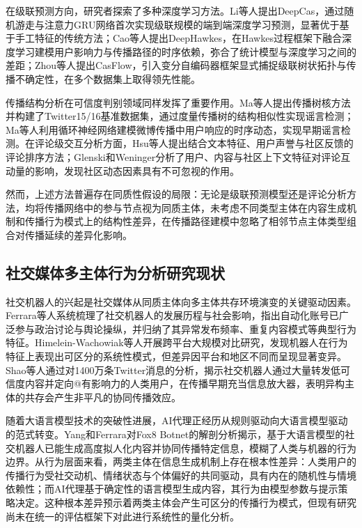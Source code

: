 在级联预测方向，研究者探索了多种深度学习方法。Li等人\cite{li2017deepcas}提出DeepCas，通过随机游走与注意力GRU网络首次实现级联规模的端到端深度学习预测，显著优于基于手工特征的传统方法；Cao等人\cite{cao2017deephawkes}提出DeepHawkes，在Hawkes过程框架下融合深度学习建模用户影响力与传播路径的时序依赖，弥合了统计模型与深度学习之间的差距；Zhou等人\cite{zhou2021casflow}提出CasFlow，引入变分自编码器框架显式捕捉级联树状拓扑与传播不确定性，在多个数据集上取得领先性能。

传播结构分析在可信度判别领域同样发挥了重要作用。Ma等人\cite{ma2017detect}提出传播树核方法并构建了Twitter15/16基准数据集，通过度量传播树的结构相似性实现谣言检测；Ma等人\cite{ma2016detecting}利用循环神经网络建模微博传播中用户响应的时序动态，实现早期谣言检测。在评论级交互分析方面，Hsu等人\cite{hsu2009ranking}提出结合文本特征、用户声誉与社区反馈的评论排序方法；Glenski和Weninger\cite{glenski2017predicting}分析了用户、内容与社区上下文特征对评论互动量的影响，发现社区动态因素具有不可忽视的作用。

然而，上述方法普遍存在同质性假设的局限：无论是级联预测模型还是评论分析方法，均将传播网络中的参与节点视为同质主体，未考虑不同类型主体在内容生成机制和传播行为模式上的结构性差异，在传播路径建模中忽略了相邻节点主体类型组合对传播延续的差异化影响。

\subsection{社交媒体多主体行为分析研究现状}

社交机器人的兴起是社交媒体从同质主体向多主体共存环境演变的关键驱动因素。Ferrara等人\cite{ferrara2016rise}系统梳理了社交机器人的发展历程与社会影响，指出自动化账号已广泛参与政治讨论与舆论操纵，并归纳了其异常发布频率、重复内容模式等典型行为特征。Himelein-Wachowiak等人\cite{himelein2021bots}开展跨平台大规模对比研究，发现机器人在行为特征上表现出可区分的系统性模式，但差异因平台和地区不同而呈现显著变异。Shao等人\cite{shao2018spread}通过对1400万条Twitter消息的分析，揭示社交机器人通过大量转发低可信度内容并定向@有影响力的人类用户，在传播早期充当信息放大器，表明异构主体的共存会产生非平凡的协同传播效应。

随着大语言模型技术的突破性进展\cite{brown2020language}，AI代理正经历从规则驱动向大语言模型驱动的范式转变。Yang和Ferrara\cite{yang2024anatomy}对Fox8 Botnet的解剖分析揭示，基于大语言模型的社交机器人已能生成高度拟人化内容并协同传播特定信息，模糊了人类与机器的行为边界。从行为层面来看，两类主体在信息生成机制上存在根本性差异：人类用户的传播行为受社交动机、情绪状态与个体偏好的共同驱动，具有内在的随机性与情境依赖性；而AI代理基于确定性的语言模型生成内容，其行为由模型参数与提示策略决定。这种根本差异预示着两类主体会产生可区分的传播行为模式，但现有研究尚未在统一的评估框架下对此进行系统性的量化分析。


